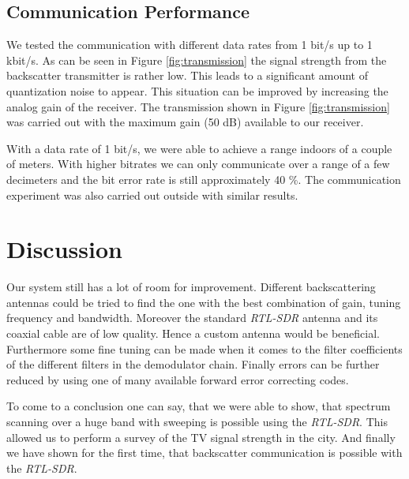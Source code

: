 \documentclass[conference]{IEEEtran}
\begin{document}
\begin{figure}[h]
\label{fig:haversine}
\end{figure}

\balance

\subsection{Communication Performance}
We tested the communication with different data rates from 1 bit/s up to
1 kbit/s. As can be seen in Figure \ref{fig:transmission} the signal
strength from the backscatter transmitter is rather low. This leads to a
significant amount of quantization noise to appear. This situation can
be improved by increasing the analog gain of the receiver. The
transmission shown in Figure \ref{fig:transmission} was carried out with
the maximum gain (50 dB) available to our receiver. 

With a data rate of 1 bit/s, we were able to achieve a range indoors
of a couple of meters. With higher bitrates we
can only communicate over a range of a few decimeters and the 
bit error rate is still approximately 40 \%. The communication
experiment was also carried out outside with similar results.


\section{Discussion}

Our system still has a lot of room for improvement.  Different
backscattering antennas could be tried to find the one with the best
combination of gain, tuning frequency and bandwidth. Moreover the
standard \textit{RTL-SDR} antenna and its coaxial cable are of low
quality.  Hence a custom antenna would be beneficial. Furthermore some
fine tuning can be made when it comes to the filter coefficients of the
different filters in the demodulator chain. Finally  errors can be
further reduced by using one of many available forward error correcting
codes.

To come to a conclusion one can say, that we were able to show, that
spectrum scanning over a huge band with sweeping is possible using the
\textit{RTL-SDR}.  This allowed us to perform a survey of the TV signal
strength in the city. And finally we have shown for the first time, that
backscatter communication is possible with the \textit{RTL-SDR}.














\end{document}
